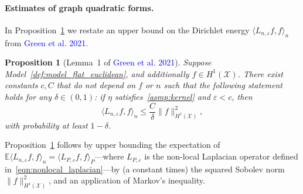 \documentclass{article}
\newcommand{\1}{\mathbf{1}}
\newcommand{\mc}[1]{\mathcal{#1}}
\newcommand{\Ebb}{\mathbb{E}}
\newcommand{\dotp}[2]{\langle #1, #2 \rangle}
\theoremstyle{alden}
\theoremstyle{aldenthm}
\newtheorem{proposition}{Proposition}
\theoremstyle{definition}
\theoremstyle{remark}
\begin{document}
\paragraph{Estimates of graph quadratic forms.}
In Proposition~\ref{prop:graph_seminorm_fo} we restate an upper bound on the Dirichlet energy $\dotp{L_{n,\varepsilon}f}{f}_n$ from \textcolor{blue}{Green et al. 2021}. 
\begin{proposition}[Lemma~1 of \textcolor{blue}{Green et al. 2021}]
	\label{prop:graph_seminorm_fo}
	Suppose Model~\ref{def:model_flat_euclidean}, and additionally $f \in H^1(\mc{X})$. There exist constants $c,C$ that do not depend on $f$ or $n$ such that the following statement holds for any $\delta \in (0,1)$: if $\eta$ satisfies~\ref{asmp:kernel} and $\varepsilon < c$, then
	\begin{equation}
	\label{eqn:graph_seminorm_fo}
	\dotp{L_{n,\varepsilon}f}{f}_n \leq \frac{C}{\delta} \|f\|_{H^1(\mc{X})}^2,
	\end{equation}
	with probability at least $1 - \delta$.
\end{proposition}
Proposition~\ref{prop:graph_seminorm_fo} follows by upper bounding the expectation of $\Ebb\dotp{L_{n,\varepsilon}f}{f}_n = \dotp{L_{P,\varepsilon}f}{f}_P$---where $L_{P,\varepsilon}$ is the non-local Laplacian operator defined in~\eqref{eqn:nonlocal_laplacian}---by (a constant times) the squared Sobolev norm $\|f\|_{H^1(\mc{X})}^2$, and an application of Markov's inequality.
\end{document}
